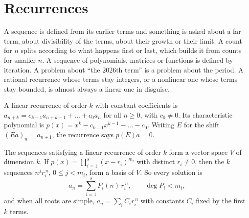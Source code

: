 \section{Recurrences}

\begin{recognise}
A sequence is defined from its earlier terms and something is asked about a far term, about divisibility of the terms, about their growth or their limit. A count for $n$ splits according to what happens first or last, which builds it from counts for smaller $n$. A sequence of polynomials, matrices or functions is defined by iteration. A problem about ``the $2026$th term'' is a problem about the period. A rational recurrence whose terms stay integers, or a nonlinear one whose terms stay bounded, is almost always a linear one in disguise.
\end{recognise}

\begin{definition}
A linear recurrence of order $k$ with constant coefficients is $a_{n+k}=c_{k-1}a_{n+k-1}+\dots+c_0a_n$ for all $n\ge 0$, with $c_0\ne 0$. Its characteristic polynomial is $p(x)=x^k-c_{k-1}x^{k-1}-\dots-c_0$. Writing $E$ for the shift $(Ea)_n=a_{n+1}$, the recurrence says $p(E)a=0$.
\end{definition}

\begin{theorem}
The sequences satisfying a linear recurrence of order $k$ form a vector space $V$ of dimension $k$. If $p(x)=\prod_{i=1}^s(x-r_i)^{m_i}$ with distinct $r_i\ne 0$, then the $k$ sequences $n^jr_i^{\,n}$, $0\le j<m_i$, form a basis of $V$. So every solution is
\[
a_n=\sum_{i=1}^s P_i(n)\,r_i^{\,n},\qquad \deg P_i<m_i,
\]
and when all roots are simple, $a_n=\sum_i C_ir_i^{\,n}$ with constants $C_i$ fixed by the first $k$ terms.
\end{theorem}

